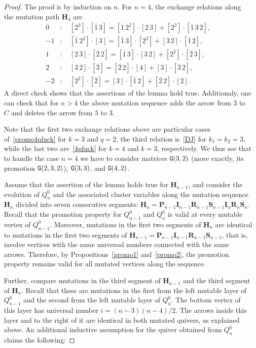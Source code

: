 \documentclass{amsart}
\theoremstyle{definition}
\theoremstyle{remark}
\numberwithin{equation}{section}
\numberwithin{theorem}{section}
\def\Hs{\mathbf H}
\def\Is{\mathbf I}
\def\NG{{\tt G}}
\def\Ps{\mathbf P}
\def\Rs{\mathbf R}
\def\S{{\mathbf S}}
\begin{document}
\begin{proof} The proof is by induction on $n$. For $n=4$, the exchange relations along the mutation path $\Hs_4$ are
\begin{equation}\label{exchange4}
\begin{aligned}
0&:\quad [2^3]\cdot[\bar 1\,3]=[\bar 1\,2^2]\cdot[2\,3]+[2^2]\cdot[\bar 1\,3\,2], \\
-1&: \quad [\bar 1\,2^2]\cdot[3]=[\bar 1\,3]\cdot[2^2]+[3\,2]\cdot[\bar 1\,2],\\
1&: \quad [2\,3]\cdot[\bar 2\,2]=[\bar 1\,3]\cdot[3\,2]+[2^2]\cdot[\bar 2\,3], \\
2&: \quad [3\,2]\cdot[\bar 3]=[\bar 2\,2]\cdot[4]+[3]\cdot[\bar 3\,2],\\
-2&: \quad [2^2]\cdot[\bar 2]=[3]\cdot[\bar 1\,2]+[\bar 2\,2]\cdot[2].
\end{aligned}
\end{equation}
A direct check shows that the assertions of the lemma hold true. Additionaly, one can check that for $n>4$ the above mutation sequence adds the arrow from $3$ to $C$ and deletes the arrow from $5$ to $3$.

Note that the first two exchange relations above are 
particular cases of~\eqref{promo4pluck} for $k=3$ and $q=2$,   
the third relation is~\eqref{DJ} for $k_1=k_2=3$, while the last two are~\eqref{4pluck} for $k=4$ and $k=3$, respectively. We thus see that to handle the case $n=4$ we have to consider matrices $\NG(3,2)$ (more exactly, its promotion $\NG(2,3,2)$), $\NG(3,3)$, and $\NG(4,2)$.

Assume that the assertion of the lemma holds true for $\Hs_{n-1}$, and consider the evolution of $Q_n^0$ and the associated cluster variables along the mutation sequence $\Hs_n$ divided into seven consecutive segments: $\Hs_n=\Ps_{n-1}\Is_{n-1}\Rs_{n-1}\S_{n-1}\Is_n\Rs_n\S_n$. Recall that the promotion property for $Q_{n-1}^0$ and $Q_n^0$ is valid at every mutable vertex of $Q_{n-1}^0$. Moreover, mutations in the first two segments of $\Hs_n$ are identical to mutations in the first two segments of $\Hs_{n-1}=\Ps_{n-1}\Is_{n-1}\Rs_{n-1}\S_{n-1}$, that is, involve vertices with the same universal numbers connected with the same arrows. Therefore, by Propositions~\ref{promo1} and~\ref{promo2},
the promotion property remains valid for all mutated vertices along the sequence.

Further, compare mutations in the third segment of $\Hs_{n-1}$ and the third segment of $\Hs_{n}$. Recall that these
are mutations in the first from the left mutable layer of $Q_{n-1}^0$ and the second from the left mutable layer of $Q_n^0$. The bottom vertex of this layer has universal number $i=(n-3)(n-4)/2$.
The arrows inside this layer and to the right of it are identical in both mutated quivers, as explained above. 
An additional inductive assumption for the quiver obtained from $Q_n^0$ claims the following: 


\end{proof}
\end{document}
